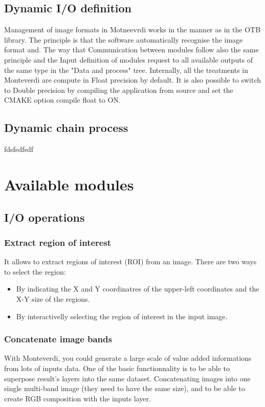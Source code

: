 \documentclass{InsightSoftwareGuide}
\begin{document}
\section{Dynamic I/O definition}
Management of image formats in Motneevrdi works in the manner as in the OTB library.
The principle is that the software automatically recognise the image format and.
The way that
Communication between modules follow also the same principle and the Input definition of modules request to all available
outputs of the same type in the "Data and process" tree.
Internally, all the treatments in Monteverdi are compute in Float precision by default. It is also possible to switch to Double 
precision by compiling the application from source and set the CMAKE option compile float to ON.
 

\section{Dynamic chain process}
fdsfsdfsdf

\chapter{Available modules}
\section{I/O operations}
\subsection{Extract region of interest}
It allows to extract regions of interest (ROI) from an image. There are two ways to select the region:
\begin{itemize}
\item By indicating the X and Y coordinatres of the upper-left coordinates and the X-Y size of the regions.
\item By interactivelly selecting the region of interest in the input image.
\end{itemize}

\subsection{Concatenate image bands}
With Monteverdi, you could generate a large scale of value added informations from lots of inputs data. One of the basic
functionnality is to be able to superpose result's layers into the same dataset.  
Concatenating images into one single multi-band image (they need to have the same size), and to be able to create RGB composition 
with the inputs layer.
\end{document}
